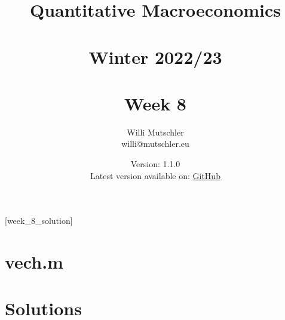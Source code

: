
\newif\ifDisplaySolutions\DisplaySolutionstrue


\title{Quantitative Macroeconomics\\~\\Winter 2022/23\\~\\Week 8}
\author{Willi Mutschler\\willi@mutschler.eu}
\date{Version: 1.1.0\\Latest version available on: \href{https://github.com/wmutschl/Quantitative-Macroeconomics/releases/latest/download/week_8.pdf}{GitHub}}
\maketitle\thispagestyle{empty}

\newpage
{}[week_8_solution]
\tableofcontents\thispagestyle{empty}\newpage

\setcounter{page}{1}
\newpage
\newpage
\newpage
\newpage

\printbibliography
\appendix
\section{vech.m}



\ifDisplaySolutions
\newpage
\appendix
\section{Solutions}

\fi

